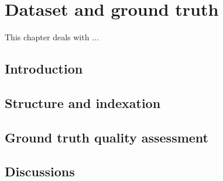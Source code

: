 \chapter{Dataset and ground truth} %
\label{chap:dt}
\graphicspath{{./chapters/9-gt/figs/}}
This chapter\cite{Guerin2013} deals with ...

\section{Introduction}
\label{sec:gt:intro}


\section{Structure and indexation}
\label{sec:gt:structure_indexation}

\section{Ground truth quality assessment}
\label{sec:gt:ground_truth_quality_assessment}


\section{Discussions}
\label{sec:gt:siscussions}


